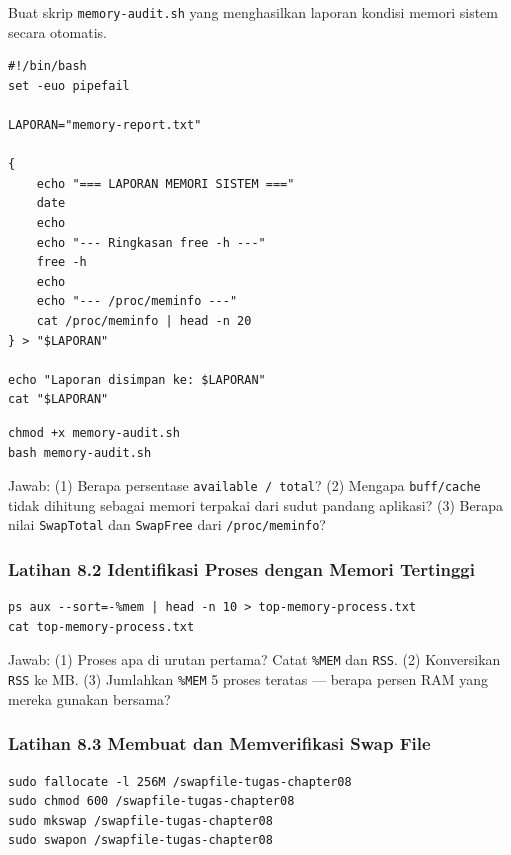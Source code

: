 Buat skrip \texttt{memory-audit.sh} yang menghasilkan laporan kondisi memori
sistem secara otomatis.

\begin{lstlisting}[caption={Isi file memory-audit.sh}]
#!/bin/bash
set -euo pipefail

LAPORAN="memory-report.txt"

{
    echo "=== LAPORAN MEMORI SISTEM ==="
    date
    echo
    echo "--- Ringkasan free -h ---"
    free -h
    echo
    echo "--- /proc/meminfo ---"
    cat /proc/meminfo | head -n 20
} > "$LAPORAN"

echo "Laporan disimpan ke: $LAPORAN"
cat "$LAPORAN"
\end{lstlisting}

\begin{lstlisting}[caption={Jalankan skrip audit}]
chmod +x memory-audit.sh
bash memory-audit.sh
\end{lstlisting}

Jawab: (1) Berapa persentase \texttt{available / total}? (2) Mengapa \texttt{buff/cache}
tidak dihitung sebagai memori terpakai dari sudut pandang aplikasi? (3) Berapa nilai
\texttt{SwapTotal} dan \texttt{SwapFree} dari \texttt{/proc/meminfo}?

\subsubsection{Latihan 8.2 Identifikasi Proses dengan Memori Tertinggi}

\begin{lstlisting}[caption={Simpan daftar proses teratas}]
ps aux --sort=-%mem | head -n 10 > top-memory-process.txt
cat top-memory-process.txt
\end{lstlisting}

Jawab: (1) Proses apa di urutan pertama? Catat \texttt{\%MEM} dan \texttt{RSS}.
(2) Konversikan \texttt{RSS} ke MB. (3) Jumlahkan \texttt{\%MEM} 5 proses teratas
--- berapa persen RAM yang mereka gunakan bersama?

\subsubsection{Latihan 8.3 Membuat dan Memverifikasi Swap File}

\begin{lstlisting}[caption={Buat dan aktifkan swap file tugas}]
sudo fallocate -l 256M /swapfile-tugas-chapter08
sudo chmod 600 /swapfile-tugas-chapter08
sudo mkswap /swapfile-tugas-chapter08
sudo swapon /swapfile-tugas-chapter08
\end{lstlisting}

